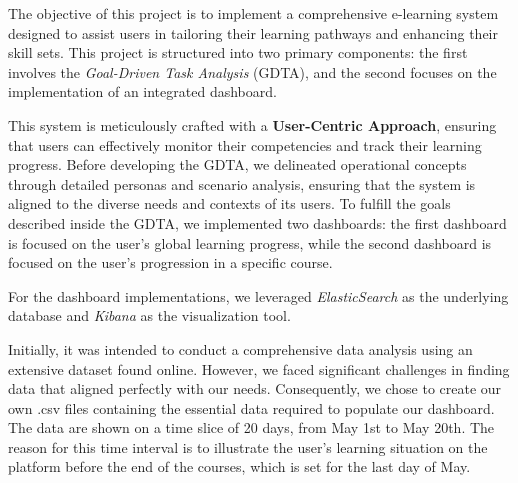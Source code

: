 The objective of this project is to implement a comprehensive e-learning system designed to assist users 
in tailoring their learning pathways and enhancing their skill sets. This project is structured into two primary components: the first involves the \textit{Goal-Driven Task Analysis} (GDTA), and the second focuses on the implementation of an integrated dashboard.

This system is meticulously crafted with a \textbf{User-Centric Approach}, ensuring that users can effectively 
monitor their competencies and track their learning progress. Before developing the GDTA, we delineated operational 
concepts through detailed personas and scenario analysis, ensuring that the system is aligned to the diverse needs 
and contexts of its users. To fulfill the goals described inside the GDTA, we implemented two dashboards: the first
dashboard is focused on the user's global learning progress, while the second dashboard is focused on the user's
progression in a specific course.

For the dashboard implementations, we leveraged \textit{ElasticSearch} as the underlying database and \textit{Kibana} 
as the visualization tool. 

Initially, it was intended to conduct a comprehensive data analysis using an extensive dataset found online. However, 
we faced significant challenges in finding data that aligned perfectly with our needs. Consequently, we 
chose to create our own .csv files containing the essential data required to populate our dashboard. The data 
are shown on a time slice of 20 days, from May 1st to May 20th. The reason for 
this time interval is to illustrate the user's learning situation on the platform before the end of the courses,
which is set for the last day of May. 

